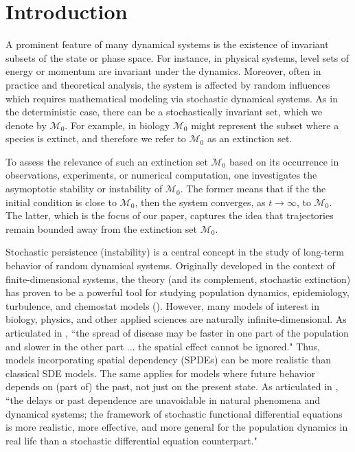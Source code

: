 \documentclass[final]{amsart}
\numberwithin{thm}{section}
\numberwithin{equation}{section}
\newcommand{\mcM}{\mathcal{M}}
\begin{document}
\section{Introduction}
A prominent feature of many dynamical systems is the existence of invariant subsets of the state or phase space. For instance, in physical systems, level sets of energy or momentum are invariant under the dynamics.
Moreover, often in practice and theoretical analysis, the system is affected by random influences which requires mathematical modeling via stochastic dynamical systems. As in the deterministic case, there can be a stochastically invariant set, which we denote by $\mcM_0$. For example, in biology $\mcM_0$ might represent the subset where a species is extinct, and therefore we refer to $\mcM_0$ as an extinction set.   


To assess the relevance of such an extinction set $\mcM_0$ based on its occurrence in observations, experiments, or numerical computation, one investigates the asymoptotic stability or instability of $\mcM_0$. The former means that if the the initial condition is close to $\mcM_0$, then the system converges, as $t \to \infty$, to $\mcM_0$. The latter, which is the focus of our paper, captures the idea that trajectories remain bounded away from the extinction set $\mcM_0$.

Stochastic persistence (instability) is a central concept in the study of long-term behavior of random dynamical systems. Originally developed in the context of finite-dimensional systems, the theory (and its complement, stochastic extinction) has proven to be a powerful tool for studying population dynamics, epidemiology, turbulence, and chemostat models (\cite{persistence, extinction}). However, many models of interest in biology, physics, and other applied sciences are naturally infinite-dimensional. 
As articulated in \cite{deterministic-SIR}, ``the spread of disease may be faster in one part of the population and slower in the other part ... the spatial effect cannot be ignored." Thus, models incorporating spatial dependency (SPDEs) can be more realistic than classical SDE models. The same applies for models where future behavior depends on (part of) the past, not just on the present state. As articulated in \cite{functional}, ``the delays or past dependence are unavoidable in natural phenomena
 and dynamical systems; the framework of stochastic functional differential equations is more realistic, more effective, and more general for the population dynamics in real life than a stochastic differential equation counterpart." 
 
\end{document}
